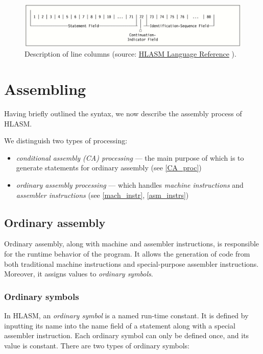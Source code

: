 \begin{figure}
	\includegraphics[width=\textwidth]{img/line}
	\caption{Description of line columns (source: \href{https://www-01.ibm.com/servers/resourcelink/svc00100.nsf/pages/zOSV2R3sc264940/$file/asmr1023.pdf}{HLASM Language Reference} ).}
	\label{fig01:line}
\end{figure}


\section{Assembling}
\label{Assembling}

Having briefly outlined the syntax, we now describe the assembly process of HLASM. 

We distinguish two types of processing:

\begin{itemize}
	\item \emph{conditional assembly (CA) processing} --- the main purpose of which is to generate statements for ordinary assembly (see \cref{CA_proc})
	\item \emph{ordinary assembly processing} --- which handles \emph{machine instructions} and \emph{assembler instructions} (see \cref{mach_instr}, \cref{asm_instrs})
\end{itemize}

\subsection{Ordinary assembly}

Ordinary assembly, along with machine and assembler instructions, is responsible for the runtime behavior of the program. It allows the generation of code from both traditional machine instructions and special-purpose assembler instructions. Moreover, it assigns values to \emph{ordinary symbols}.

\subsubsection{Ordinary symbols}
\label{ord_sym}

In HLASM, an \emph{ordinary symbol} is a named run-time constant. It is defined by inputting its name into the name field of a statement along with a special assembler instruction. Each ordinary symbol can only be defined once, and its value is constant. There are two types of ordinary symbols:
 
